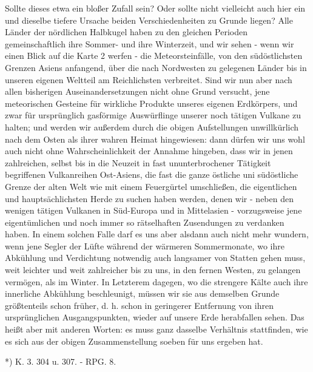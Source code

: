 \documentclass[a4paper, 8pt, oneside, polutonikogreek, german]{article}
\begin{document}
Sollte dieses etwa ein bloßer Zufall sein? Oder sollte nicht vielleicht auch hier ein und dieselbe tiefere Ursache beiden Verschiedenheiten zu Grunde liegen? Alle Länder der nördlichen Halbkugel haben zu den gleichen Perioden gemeinschaftlich ihre Sommer- und ihre Winterzeit, und wir sehen - wenn wir einen Blick auf die Karte 2 werfen - die Meteorsteinfälle, von den südöstlichsten Grenzen Asiens anfangend, über die nach Nordwesten zu gelegenen Länder bis in unseren eigenen Weltteil am Reichlichsten verbreitet. Sind wir nun aber nach allen bisherigen Auseinandersetzungen nicht ohne Grund versucht, jene meteorischen Gesteine für wirkliche Produkte unseres eigenen Erdkörpers, und zwar für ursprünglich gasförmige Auswürflinge unserer noch tätigen Vulkane zu halten; und werden wir außerdem durch die obigen Aufstellungen unwillkürlich nach dem Osten als ihrer wahren Heimat hingewiesen: dann dürfen wir uns wohl auch nicht ohne Wahrscheinlichkeit der Annahme hingeben, dass wir in jenen zahlreichen, selbst bis in die Neuzeit in fast ununterbrochener Tätigkeit begriffenen Vulkanreihen Ost-Asiens, die fast die ganze östliche uni südöstliche Grenze der alten Welt wie mit einem Feuergürtel umschließen, die eigentlichen und hauptsächlichsten Herde zu suchen haben werden, denen wir - neben den wenigen tätigen Vulkanen in Süd-Europa und in Mittelasien - vorzugsweise jene eigentümlichen und noch immer so rätselhaften Zusendungen zu verdanken haben. In einem solchen Falle darf es uns aber alsdann auch nicht mehr wundern, wenn jene Segler der Lüfte während der wärmeren Sommermonate, wo ihre Abkühlung und Verdichtung notwendig auch langsamer von Statten gehen muss, weit leichter und weit zahlreicher bis zu uns, in den fernen Westen, zu gelangen vermögen, als im Winter. In Letzterem dagegen, wo die strengere Kälte auch ihre innerliche Abkühlung beschleunigt, müssen wir sie aus demselben Grunde größtenteils schon früher, d. h. schon in geringerer Entfernung von ihren ursprünglichen Ausgangspunkten, wieder auf unsere Erde herabfallen sehen. Das heißt aber mit anderen Worten: es muss ganz dasselbe Verhältnis stattfinden, wie es sich aus der obigen Zusammenstellung soeben für uns ergeben hat.

*) K. 3. 304 u. 307. - RPG. 8.
\end{document}

